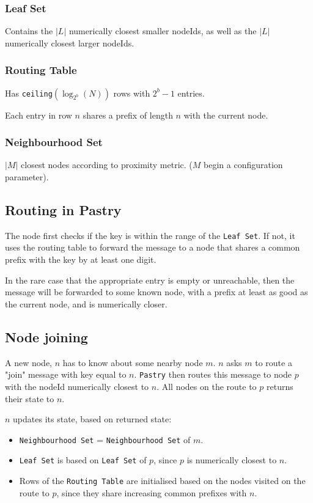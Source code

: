 	\subsubsection{Leaf Set}
	Contains the $\lvert L \rvert$ numerically closest smaller nodeIds, as well as the $\lvert L \rvert$ numerically closest larger nodeIds.
	
	\subsubsection{Routing Table}
	Has \texttt{ceiling}$(\log_{2^b}(N))$ rows with $2^b-1$ entries. 
	
	Each entry in row $n$ shares a prefix of length $n$ with the current node.
	
	\subsubsection{Neighbourhood Set}
	$\lvert M \rvert$ closest nodes according to proximity metric. ($M$ begin a configuration parameter).
	
	\subsection{Routing in Pastry}
	The node first checks if the key is within the range of the \texttt{Leaf Set}. If not, it uses the routing table to forward the message to a node that shares a common prefix with the key by at least one digit.
	
	In the rare case that the appropriate entry is empty or unreachable, then the message will be forwarded to some known node, with a prefix at least as good as the current node, and is numerically closer.
	
	\subsection{Node joining}
	A new node, $n$ has to know about some nearby node $m$. $n$ asks $m$ to route a "join" message with key equal to $n$. \texttt{Pastry} then routes this message to node $p$ with the nodeId numerically closest to $n$. All nodes on the route to $p$ returns their state to $n$.
	
	$n$ updates its state, based on returned state:
	\begin{itemize}
		\item \texttt{Neighbourhood Set} = \texttt{Neighbourhood Set} of $m$.
		\item \texttt{Leaf Set} is based on \texttt{Leaf Set} of $p$, since $p$ is numerically closest to $n$.
		\item Rows of the \texttt{Routing Table} are initialised based on the nodes visited on the route to $p$, since they share increasing common prefixes with $n$.
	\end{itemize}
	
